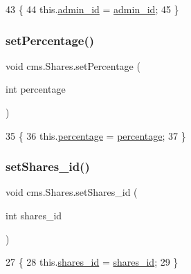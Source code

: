\begin{DoxyCode}
43                                           \{
44         this.\mbox{\hyperlink{classcms_1_1_shares_a04c23ccc0ceb9f01dad2e5cb65cbc7e6}{admin\_id}} = \mbox{\hyperlink{classcms_1_1_shares_a04c23ccc0ceb9f01dad2e5cb65cbc7e6}{admin\_id}};
45     \}
\end{DoxyCode}
\mbox{\label{classcms_1_1_shares_a8f1f69169cb7f4e6f3713d9b3e057d1c}} 
\subsubsection{\texorpdfstring{set\+Percentage()}{setPercentage()}}
{\footnotesize\ttfamily void cms.\+Shares.\+set\+Percentage (\begin{DoxyParamCaption}\item[{int}]{percentage }\end{DoxyParamCaption})\hspace{0.3cm}{\ttfamily [inline]}}


\begin{DoxyCode}
35                                               \{
36         this.\mbox{\hyperlink{classcms_1_1_shares_a7235d21d3198a5acbd0135d6486e6f51}{percentage}} = \mbox{\hyperlink{classcms_1_1_shares_a7235d21d3198a5acbd0135d6486e6f51}{percentage}};
37     \}
\end{DoxyCode}
\mbox{\label{classcms_1_1_shares_a8af73b7871377976b993fec8d79b23d3}} 
\subsubsection{\texorpdfstring{set\+Shares\+\_\+id()}{setShares\_id()}}
{\footnotesize\ttfamily void cms.\+Shares.\+set\+Shares\+\_\+id (\begin{DoxyParamCaption}\item[{int}]{shares\+\_\+id }\end{DoxyParamCaption})\hspace{0.3cm}{\ttfamily [inline]}}


\begin{DoxyCode}
27                                             \{
28         this.\mbox{\hyperlink{classcms_1_1_shares_a15e43f7e31f2c147893fc92c4a94037a}{shares\_id}} = \mbox{\hyperlink{classcms_1_1_shares_a15e43f7e31f2c147893fc92c4a94037a}{shares\_id}};
29     \}
\end{DoxyCode}
\mbox{\label{classcms_1_1_shares_a4d5f794df6ae573de5497de193a81a1b}} 
